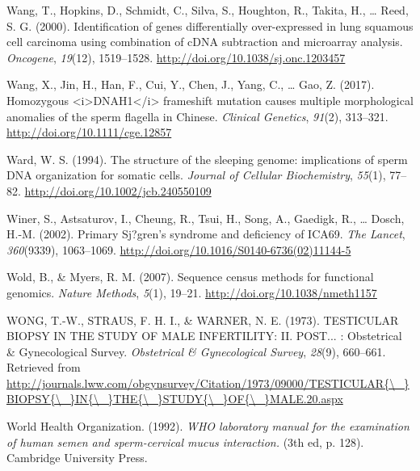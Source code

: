 \documentclass[12pt,twoside]{reedthesis}
\theoremstyle{definition}
\theoremstyle{definition}
\theoremstyle{remark}
\begin{document}
  \hypertarget{ref-Wang2000}{}
  Wang, T., Hopkins, D., Schmidt, C., Silva, S., Houghton, R., Takita, H.,
  \ldots{} Reed, S. G. (2000). Identification of genes differentially
  over-expressed in lung squamous cell carcinoma using combination of cDNA
  subtraction and microarray analysis. \emph{Oncogene}, \emph{19}(12),
  1519--1528. \url{http://doi.org/10.1038/sj.onc.1203457}
  
  \hypertarget{ref-Wang2017}{}
  Wang, X., Jin, H., Han, F., Cui, Y., Chen, J., Yang, C., \ldots{} Gao,
  Z. (2017). Homozygous
  \textless{}i\textgreater{}DNAH1\textless{}/i\textgreater{} frameshift
  mutation causes multiple morphological anomalies of the sperm flagella
  in Chinese. \emph{Clinical Genetics}, \emph{91}(2), 313--321.
  \url{http://doi.org/10.1111/cge.12857}
  
  \hypertarget{ref-Ward1994}{}
  Ward, W. S. (1994). The structure of the sleeping genome: implications
  of sperm DNA organization for somatic cells. \emph{Journal of Cellular
  Biochemistry}, \emph{55}(1), 77--82.
  \url{http://doi.org/10.1002/jcb.240550109}
  
  \hypertarget{ref-Winer2002}{}
  Winer, S., Astsaturov, I., Cheung, R., Tsui, H., Song, A., Gaedigk, R.,
  \ldots{} Dosch, H.-M. (2002). Primary Sj?gren's syndrome and deficiency
  of ICA69. \emph{The Lancet}, \emph{360}(9339), 1063--1069.
  \url{http://doi.org/10.1016/S0140-6736(02)11144-5}
  
  \hypertarget{ref-Wold2007}{}
  Wold, B., \& Myers, R. M. (2007). Sequence census methods for functional
  genomics. \emph{Nature Methods}, \emph{5}(1), 19--21.
  \url{http://doi.org/10.1038/nmeth1157}
  
  \hypertarget{ref-WONG1973}{}
  WONG, T.-W., STRAUS, F. H. I., \& WARNER, N. E. (1973). TESTICULAR
  BIOPSY IN THE STUDY OF MALE INFERTILITY: II. POST... : Obstetrical \&
  Gynecological Survey. \emph{Obstetrical \& Gynecological Survey},
  \emph{28}(9), 660--661. Retrieved from
  \href{http://journals.lww.com/obgynsurvey/Citation/1973/09000/TESTICULAR\%7B/_\%7DBIOPSY\%7B/_\%7DIN\%7B/_\%7DTHE\%7B/_\%7DSTUDY\%7B/_\%7DOF\%7B/_\%7DMALE.20.aspx}{http://journals.lww.com/obgynsurvey/Citation/1973/09000/TESTICULAR\{\textbackslash{}\_\}BIOPSY\{\textbackslash{}\_\}IN\{\textbackslash{}\_\}THE\{\textbackslash{}\_\}STUDY\{\textbackslash{}\_\}OF\{\textbackslash{}\_\}MALE.20.aspx}
  
  \hypertarget{ref-WorldHealthOrganization1992}{}
  World Health Organization. (1992). \emph{WHO laboratory manual for the
  examination of human semen and sperm-cervical mucus interaction.} (3th
  ed, p. 128). Cambridge University Press.
  
\end{document}
